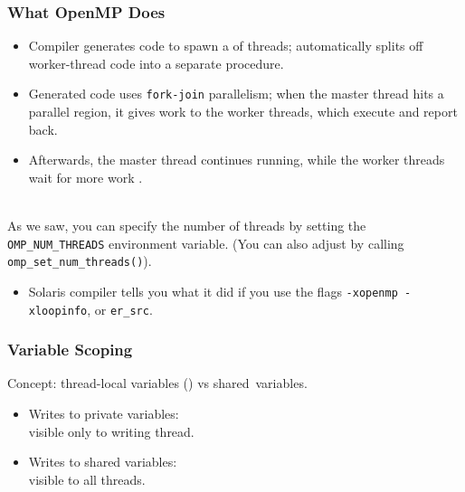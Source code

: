 \begin{frame}[containsverbatim]
  \frametitle{What OpenMP Does}

  
  \begin{itemize}
    \item Compiler generates code to spawn a 
of threads; automatically splits off worker-thread code into a
separate procedure.
    \item Generated code uses {\tt fork-join} parallelism; when the
master thread hits a parallel region, it gives work to the worker
threads, which execute and report back.
    \item Afterwards, the master thread
continues running, while the worker threads wait for more work .
  \end{itemize}

~\\
As we saw, you can specify the number of threads by setting the
\verb+OMP_NUM_THREADS+ environment variable. (You can also adjust by calling 
\verb+omp_set_num_threads()+).

\begin{itemize}
  \item Solaris compiler tells you what it did if you use the flags \verb+-xopenmp -xloopinfo+, or \verb+er_src+.
\end{itemize}

  


\end{frame}

\begin{frame}[fragile]
  \frametitle{Variable Scoping}

  

  Concept: thread-local variables ()
      vs shared~variables.
  \begin{itemize}
    \item Writes to private variables:\\
\qquad visible only to writing thread.
    \item Writes to shared variables:\\ 
\qquad visible to all threads.
  \end{itemize}

  

\end{frame}

